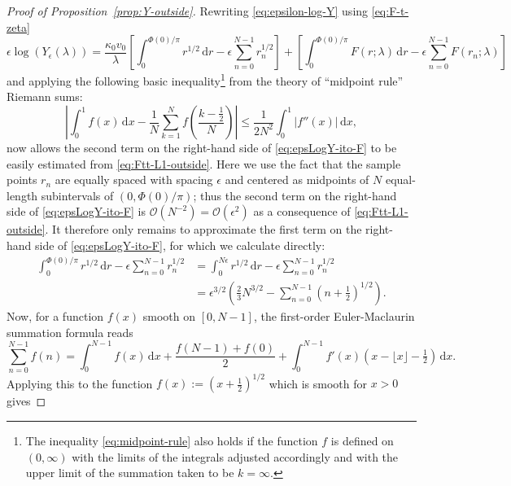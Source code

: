 \documentclass[12pt]{amsart}
\numberwithin{equation}{section}
\newcommand{\dd}{\mathrm{d}}
\newcommand{\SP}{\lambda}
\newcommand{\phaseint}{\Phi}
\newcommand{\rr}{r}
\newcommand{\bigo}[1]{ \mathcal{O}\! \left( #1 \right) }
\begin{document}
\begin{proof}[Proof of Proposition~\ref{prop:Y-outside}]
Rewriting \eqref{eq:epsilon-log-Y} using \eqref{eq:F-t-zeta}
\begin{equation}
\epsilon\log(Y_\epsilon(\SP))=\frac{\kappa_0v_0}{\SP}\left[\int_0^{\phaseint(0)/\pi} \rr^{1/2}\,\dd \rr-
\epsilon\sum_{n=0}^{N-1}\rr_n^{1/2}\right] +\left[\int_0^{\phaseint(0)/\pi}F(\rr;\SP)\,\dd \rr - 
\epsilon\sum_{n=0}^{N-1}F(\rr_n;\SP)\right]
\label{eq:epsLogY-ito-F}
\end{equation}
and applying the following basic inequality\footnote{The inequality \eqref{eq:midpoint-rule} also holds if the function $f$ is defined on $(0,\infty)$ with the limits of the integrals adjusted accordingly and with the upper limit of the summation taken to be $k=\infty$.} from the theory of ``midpoint rule'' Riemann sums:
\begin{equation}
\left|\int_0^1 f(x)\,\dd x -\frac{1}{N}\sum_{k=1}^N f\left(\frac{k-\tfrac{1}{2}}{N}\right)\right|\le
\frac{1}{2N^2}\int_0^1|f''(x)|\,\dd x,
\label{eq:midpoint-rule}
\end{equation}
now allows the second term on the right-hand side of \eqref{eq:epsLogY-ito-F} to be easily estimated from \eqref{eq:Ftt-L1-outside}.
Here we use the fact that the sample points $\rr_n$ are equally spaced with spacing $\epsilon$ and centered as midpoints of $N$ equal-length subintervals of $(0,\phaseint(0)/\pi)$; thus
the second term 
on the right-hand side of \eqref{eq:epsLogY-ito-F} is $\bigo{N^{-2}}=\bigo{\epsilon^2}$ as a consequence of \eqref{eq:Ftt-L1-outside}.
It therefore only remains to approximate the first term on the right-hand side of \eqref{eq:epsLogY-ito-F}, for which we calculate directly:
\begin{equation}
\begin{split}
\int_0^{\phaseint(0)/\pi}\rr^{1/2}\,\dd \rr-\epsilon\sum_{n=0}^{N-1}\rr_n^{1/2}&=\int_0^{N\epsilon}\rr^{1/2}\,\dd \rr -\epsilon\sum_{n=0}^{N-1}\rr_n^{1/2}\\
&=\epsilon^{3/2}\left(\tfrac{2}{3}N^{3/2}-\sum_{n=0}^{N-1}(n+\tfrac{1}{2})^{1/2}\right).
\end{split}
\label{eq:first-term}
\end{equation}
Now, for a function $f(x)$ smooth on $[0,N-1]$, the first-order Euler-Maclaurin summation formula reads
\begin{equation}
\sum_{n=0}^{N-1}f(n)=\int_0^{N-1}f(x)\,\dd x +\frac{f(N-1)+f(0)}{2}+\int_0^{N-1}f'(x)(x-\lfloor x\rfloor-\tfrac{1}{2})\,\dd x.
\label{eq:zeta-first}
\end{equation}
Applying this to the function $f(x):=(x+\tfrac{1}{2})^{1/2}$ which is smooth for $x>0$ gives

\end{proof}
\end{document}
